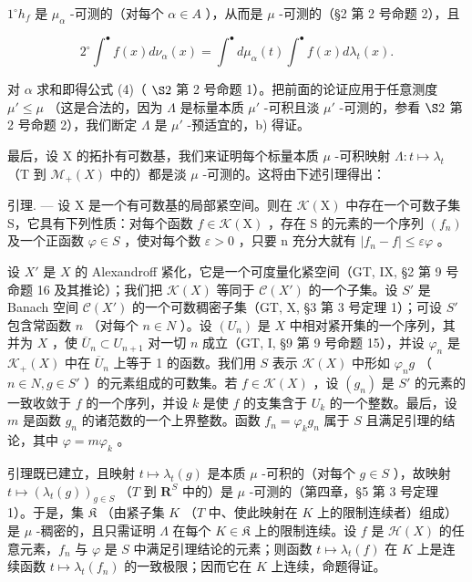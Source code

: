 \(1^{\circ} h_{f}\) 是 \(\mu_{\alpha}\) -可测的（对每个 \(\alpha \in A\) ），从而是 \(\mu\) -可测的（§2 第 2 号命题 2），且

\[
2 ^ {\circ} \int^ {\bullet} f (x) d \nu_ {\alpha} (x) = \int^ {\bullet} d \mu_ {\alpha} (t) \int^ {\bullet} f (x) d \lambda_ {t} (x).
\]

对 \(\alpha\) 求和即得公式 (4)（ \(\S 2\) 第 2 号命题 1）。把前面的论证应用于任意测度 \(\mu' \leqslant \mu\) （这是合法的，因为 \(\Lambda\) 是标量本质 \(\mu'\) -可积且淡 \(\mu'\) -可测的，参看 \(\S 2\) 第 2 号命题 2），我们断定 \(\Lambda\) 是 \(\mu'\) -预适宜的，b) 得证。

最后，设 X 的拓扑有可数基，我们来证明每个标量本质 \(\mu\) -可积映射 \(\Lambda: t \mapsto \lambda_{t}\) （T 到 \(\mathcal{M}_{+}(X)\) 中的）都是淡 \(\mu\) -可测的。这将由下述引理得出：

引理. --- 设 X 是一个有可数基的局部紧空间。则在 \(\mathcal{K}(\mathrm{X})\) 中存在一个可数子集 S，它具有下列性质：对每个函数 \(f \in \mathcal{K}(\mathrm{X})\) ，存在 S 的元素的一个序列 \((f_n)\) 及一个正函数 \(\varphi \in S\) ，使对每个数 \(\varepsilon > 0\) ，只要 n 充分大就有 \(|f_n - f| \leqslant \varepsilon \varphi\) 。

设 \(X'\) 是 \(X\) 的 Alexandroff 紧化，它是一个可度量化紧空间（GT, IX, §2 第 9 号命题 16 及其推论）；我们把 \(\mathcal{K}(X)\) 等同于 \(\mathcal{C}(X')\) 的一个子集。设 \(S'\) 是 Banach 空间 \(\mathcal{C}(X')\) 的一个可数稠密子集（GT, X, §3 第 3 号定理 1）；可设 \(S'\) 包含常函数 \(n\) （对每个 \(n \in N\) ）。设 \((U_n)\) 是 \(X\) 中相对紧开集的一个序列，其并为 \(X\) ，使 \(\overline{U}_n \subset U_{n+1}\) 对一切 \(n\) 成立（GT, I, §9 第 9 号命题 15），并设 \(\varphi_n\) 是 \(\mathcal{K}_+(X)\) 中在 \(\overline{U}_n\) 上等于 1 的函数。我们用 \(S\) 表示 \(\mathcal{K}(X)\) 中形如 \(\varphi_n g\) （ \(n \in N, g \in S'\) ）的元素组成的可数集。若 \(f \in \mathcal{K}(X)\) ，设 \((g_n)\) 是 \(S'\) 的元素的一致收敛于 \(f\) 的一个序列，并设 \(k\) 是使 \(f\) 的支集含于 \(U_k\) 的一个整数。最后，设 \(m\) 是函数 \(g_n\) 的诸范数的一个上界整数。函数 \(f_n = \varphi_k g_n\) 属于 \(S\) 且满足引理的结论，其中 \(\varphi = m\varphi_k\) 。

引理既已建立，且映射 \(t \mapsto \lambda_t(g)\) 是本质 \(\mu\) -可积的（对每个 \(g \in S\) ），故映射 \(t \mapsto (\lambda_t(g))_{g \in S}\) （\(T\) 到 \(\mathbf{R}^S\) 中的）是 \(\mu\) -可测的（第四章，§5 第 3 号定理 1）。于是，集 \(\mathfrak{K}\) （由紧子集 \(K\) （\(T\) 中、使此映射在 \(K\) 上的限制连续者）组成）是 \(\mu\) -稠密的，且只需证明 \(\Lambda\) 在每个 \(K \in \mathfrak{K}\) 上的限制连续。设 \(f\) 是 \(\mathcal{H}(X)\) 的任意元素，\(f_n\) 与 \(\varphi\) 是 \(S\) 中满足引理结论的元素；则函数 \(t \mapsto \lambda_t(f)\) 在 \(K\) 上是连续函数 \(t \mapsto \lambda_t(f_n)\) 的一致极限；因而它在 \(K\) 上连续，命题得证。
